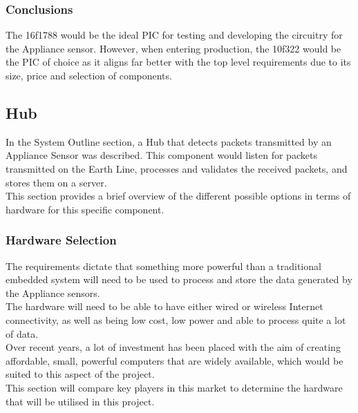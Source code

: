 \documentclass[preprint,12pt,3p]{elsarticle}
\begin{document}




\subsubsection{Conclusions}
The 16f1788 would be the ideal PIC for testing and developing the circuitry for the Appliance sensor. However, when entering production, the 10f322 would be the PIC of choice as it aligns far better with the top level requirements due to its size, price and selection of components.\\


\clearpage
\subsection{Hub}
In the System Outline section, a Hub that detects packets transmitted by an Appliance Sensor was described. This component would listen for packets transmitted on the Earth Line, processes and validates the received packets, and stores them on a server.\\
This section provides a brief overview of the different possible options in terms of hardware for this specific component.
\subsubsection{Hardware Selection}
The requirements dictate that something more powerful than a traditional embedded system will need to be used to process and store the data generated by the Appliance sensors.\\
The hardware will need to be able to have either wired or wireless Internet connectivity, as well as being low cost, low power and able to process quite a lot of data.\\
Over recent years, a lot of investment has been placed with the aim of creating affordable, small, powerful computers that are widely available, which would be suited to this aspect of the project.\\
This section will compare key players in this market to determine the hardware that will be utilised in this project.
\end{document}
